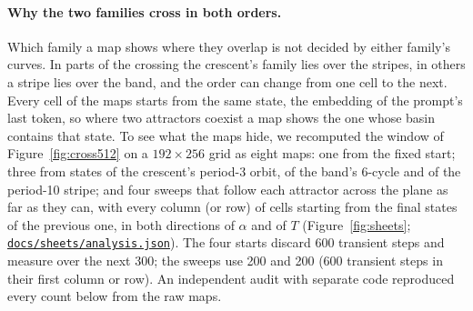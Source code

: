\documentclass[11pt,letterpaper]{article}
\newcommand{\repourl}{https://github.com/tdj28/neural-shrimp}
\newcommand{\reporef}{arxiv-v1}
\newcommand{\repo}[1]{\href{\repourl/blob/\reporef/#1}{\nolinkurl{#1}}}
\begin{document}
\paragraph{Why the two families cross in both orders.} Which family a map shows where they overlap is not decided by
either family's curves. In parts of the crossing the crescent's family lies over the stripes, in others a stripe lies
over the band, and the order can change from one cell to the next. Every cell of the maps starts from the same state,
the embedding of the prompt's last token, so where two attractors coexist a map shows the one whose basin contains that
state. To see what the maps hide, we recomputed the window of Figure~\ref{fig:cross512} on a $192\times256$ grid as
eight maps: one from the fixed start; three from states of the crescent's period-3 orbit, of the band's 6-cycle and of
the period-10 stripe; and four sweeps that follow each attractor across the plane as far as they can, with every column
(or row) of cells starting from the final states of the previous one, in both directions of $\alpha$ and of $T$
(Figure~\ref{fig:sheets}; \repo{docs/sheets/analysis.json}). The four starts discard 600 transient steps and measure
over the next 300; the sweeps use 200 and 200 (600 transient steps in their first column or row). An independent audit with separate code reproduced every
count below from the raw maps.
\end{document}
